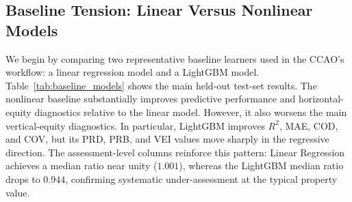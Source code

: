 \documentclass[12pt, draft]{article}
\theoremstyle{plain}
\theoremstyle{definition}
\newcommand{\1}{\mathbf{1}}
\begin{document}
\begin{table}[!ht]
\centering
\caption{Rolling-origin validation fold structure. Training windows expand chronologically; validation blocks are of fixed size.}
\label{tab:fold_structure}
\end{table}

\subsection{Baseline Tension: Linear Versus Nonlinear Models}

We begin by comparing two representative baseline learners used in the CCAO's workflow: a linear regression model and a LightGBM model. Table~\ref{tab:baseline_models} shows the main held-out test-set results. The nonlinear baseline substantially improves predictive performance and horizontal-equity diagnostics relative to the linear model. However, it also worsens the main vertical-equity diagnostics. In particular, LightGBM improves \(R^2\), MAE, COD, and COV, but its PRD, PRB, and VEI values move sharply in the regressive direction. The assessment-level columns reinforce this pattern: Linear Regression achieves a median ratio near unity (\(1.001\)), whereas the LightGBM median ratio drops to \(0.944\), confirming systematic under-assessment at the typical property value.
\end{document}
